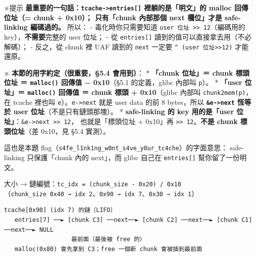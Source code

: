 \documentclass[10pt,a4paper]{article}
\renewenvironment{quote}{%
  \begin{mdframed}[linewidth=0pt,innerleftmargin=0pt,innerrightmargin=0pt,
    innerbottommargin=0pt,innertopmargin=0pt,skipabove=0.55em,skipbelow=0.55em,
    leftmargin=0.9em,rightmargin=0.4em,startcode={\color{quotebar}\vrule width 2.6pt},%
    endcode={}]%
  \itshape\color{black}%
}{%
  \end{mdframed}%
}
\begin{document}
\begin{quote}
※提示
\textbf{最重要的一句話：\texttt{tcache-\allowbreak{}\textgreater{}\allowbreak{}entries{[}{]}}
裡躺的是「明文」的 malloc 回傳位址（= chunk + 0x10）； 只有「chunk
內部那個 next 欄位」才是 safe-linking 編碼過的。} 所以： -
毒化時你只需要知道
\texttt{user\ \allowbreak{}位址\ \allowbreak{}\textgreater{}\allowbreak{}\textgreater{}\allowbreak{}\ \allowbreak{}12}（編碼用的
key），\textbf{不需要}完整的 user 位址； - 從 \texttt{entries{[}{]}}
讀到的值可以直接拿去用（不必解碼）； - 反之，從 chunk 裡 UAF 讀到的
\texttt{next} 一定要
\texttt{\^\allowbreak{}{}\allowbreak{}\ \allowbreak{}(user\ \allowbreak{}位址\textgreater{}\allowbreak{}\textgreater{}\allowbreak{}12)} 才能還原。

※ \textbf{本節的用字約定（很重要，§5.4 會用到）}： * \textbf{「chunk
位址」＝ chunk 標頭位址 ＝ \texttt{malloc()} 回傳值 − 0x10}（§5.1
的定義，glibc 內部叫 \texttt{p}）。 * \textbf{「user 位址」＝
\texttt{malloc()} 回傳值 ＝ chunk 標頭 + 0x10}（glibc 內部叫
\texttt{chunk2mem(p)}， 在 tcache 裡也叫
\texttt{e}）。\texttt{e-\allowbreak{}\textgreater{}\allowbreak{}next} 就是 user data 的前 8
bytes，所以 \textbf{\texttt{\&\allowbreak{}e-\allowbreak{}\textgreater{}\allowbreak{}next} 恆等於 user
位址}（不是只有鏈頭那塊）。 * \textbf{safe-linking 的 key 用的是「user
位址」}：\texttt{\&\allowbreak{}e-\allowbreak{}\textgreater{}\allowbreak{}next\ \allowbreak{}\textgreater{}\allowbreak{}\textgreater{}\allowbreak{}\ \allowbreak{}12}，
也就是「標頭位址 + 0x10」再
\texttt{\textgreater{}\allowbreak{}\textgreater{}\allowbreak{}\ \allowbreak{}12}。\textbf{不是 chunk
標頭位址}（差 0x10，見 §5.4 實測）。

這也是本題
flag（\texttt{s4fe\_\allowbreak{}l1nk1ng\_\allowbreak{}w0nt\_\allowbreak{}s4ve\_\allowbreak{}y0ur\_\allowbreak{}tc4che}）的字面意思：
safe-linking 只保護「chunk 內的 next」，而 glibc 自己在
\texttt{entries{[}{]}} 幫你留了一份明文。
\end{quote}

大小 → 鏈編號：\texttt{tc\_\allowbreak{}idx\ \allowbreak{}=\ \allowbreak{}(chunk\_\allowbreak{}size\ \allowbreak{}-\allowbreak{}\ \allowbreak{}0x20)\ \allowbreak{}/\allowbreak{}\ \allowbreak{}0x10}
（\texttt{chunk\_\allowbreak{}size\ \allowbreak{}0x40\ \allowbreak{}→\ \allowbreak{}idx\ \allowbreak{}2}、\texttt{0x90\ \allowbreak{}→\ \allowbreak{}idx\ \allowbreak{}7}、\texttt{0x30\ \allowbreak{}→\ \allowbreak{}idx\ \allowbreak{}1}）

\begin{Verbatim}[breaklines=true,breakanywhere=true,breakautoindent=false,fontsize=\fontsize{7.0}{9.5}\selectfont]
         tcache[0x90] (idx 7) 的鏈（LIFO）
   entries[7] ──► [chunk C3] ──next──► [chunk C2] ──next──► [chunk C1] ──next──► NULL
                   最前面（最後被 free 的）
   malloc(0x80) 會先拿到 C3；free 一個新 chunk 會被插到最前面
\end{Verbatim}
\end{document}
